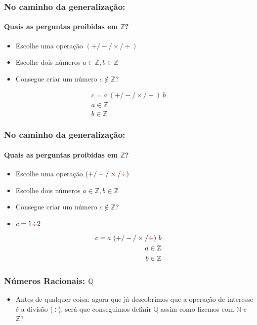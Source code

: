 \documentclass[usenames,dvipsnames,svgnames]{beamer}
\begin{document}
\begin{frame}
	
	\frametitle{No caminho da generalização:}
	\framesubtitle{Quais as perguntas proibidas em $\mathbb{Z}$?}

	\begin{itemize}
		\item Escolhe uma operação $(+ / - / \times / \div)$
		\item Escolhe dois números $a \in \mathbb{Z}, b \in \mathbb{Z}$
		\item Consegue criar um número $c \not \in \mathbb{Z}$?
	\end{itemize}

	\begin{equation}
	\begin{aligned}
		c = a ~ (+ / - / \times / \div) ~ b \\
		a \in \mathbb{Z} \\
		b \in \mathbb{Z}
	\end{aligned}
	\end{equation}

\end{frame}

\begin{frame}
	
	\frametitle{No caminho da generalização:}
	\framesubtitle{Quais as perguntas proibidas em $\mathbb{Z}$?}

	\begin{itemize}
		\item Escolhe uma operação $(+ / - / \times / {\color{red}\div})$
		\item Escolhe dois números $a \in \mathbb{Z}, b \in \mathbb{Z}$
		\item Consegue criar um número $c \not \in \mathbb{Z}$?
		\item $c = 1 {\color{red}\div} 2$
	\end{itemize}

	\begin{equation}
	\begin{aligned}
		c = a ~ (+ / - / \times / {\color{red}\div}) ~ b \\
		a \in \mathbb{Z} \\
		b \in \mathbb{Z}
	\end{aligned}
	\end{equation}

\end{frame}

\begin{frame}
	
	\frametitle{Números Racionais: $\mathbb{Q}$}

	\begin{itemize}
		\item Antes de qualquer coisa: agora que já descobrimos que a operação de interesse é a divisão ($\div$), será que conseguimos definir $\mathbb{Q}$ assim como fizemos com $\mathbb{N}$ e $\mathbb{Z}$?
	\end{itemize}

\end{frame}
\end{document}
